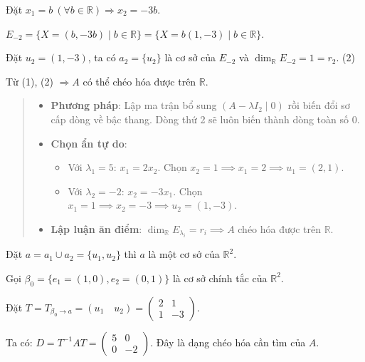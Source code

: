 \documentclass[12pt,a4paper]{article}
\newcommand{\R}{\mathbb{R}}
\begin{document}
Đặt $x_1 = b \ (\forall b \in \R) \Rightarrow x_2 = -3b$.

$E_{-2} = \{ X = (b, -3b) \mid b \in \R \} = \{ X = b(1, -3) \mid b \in \R \}$.

Đặt $u_2 = (1, -3)$, ta có $a_2 = \{u_2\}$ là cơ sở của $E_{-2}$ và $\dim_{\R} E_{-2} = 1 = r_2$. \hfill (2)

Từ (1), (2) $\Rightarrow A$ có thể chéo hóa được trên $\R$.

\begin{quote}
\small
\noindent{}\par\vspace{3pt}
\begin{itemize}[noitemsep,topsep=2pt]
\item \textbf{Phương pháp}: Lập ma trận bổ sung $(A - \lambda I_2 \mid 0)$ rồi biến đổi sơ cấp dòng về bậc thang. Dòng thứ 2 sẽ luôn biến thành dòng toàn số $0$.
\item \textbf{Chọn ẩn tự do}:
  \begin{itemize}[noitemsep]
  \item Với $\lambda_1 = 5$: $x_1 = 2x_2$. Chọn $x_2 = 1 \implies x_1 = 2 \implies u_1 = (2, 1)$.
  \item Với $\lambda_2 = -2$: $x_2 = -3x_1$. Chọn $x_1 = 1 \implies x_2 = -3 \implies u_2 = (1, -3)$.
  \end{itemize}
\item \textbf{Lập luận ăn điểm}: $\dim_{\R} E_{\lambda_i} = r_i \implies A$ chéo hóa được trên $\R$.
\end{itemize}
\end{quote}

\vspace{0.2cm}
Đặt $a = a_1 \cup a_2 = \{u_1, u_2\}$ thì $a$ là một cơ sở của $\R^2$.

Gọi $\beta_0 = \{e_1 = (1, 0), e_2 = (0, 1)\}$ là cơ sở chính tắc của $\R^2$.

Đặt $T = T_{\beta_0 \to a} = (u_1 \quad u_2) = \begin{pmatrix} 2 & 1 \\ 1 & -3 \end{pmatrix}$.

Ta có: $D = T^{-1}AT = \begin{pmatrix} 5 & 0 \\ 0 & -2 \end{pmatrix}$. Đây là dạng chéo hóa cần tìm của $A$.
\end{document}
